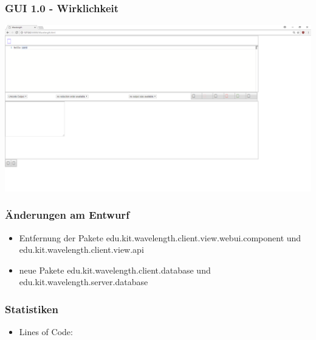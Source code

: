 \documentclass[10pt]{beamer}
\begin{document}
\begin{frame}
\frametitle{GUI 1.0 - Wirklichkeit}
\hspace*{-1cm}
\includegraphics[scale=0.19]{img/GUI1_Wirklichkeit.png}
\end{frame}


\begin{frame}
\frametitle{Änderungen am Entwurf}
\begin{itemize}
\item Entfernung der Pakete \alert{edu.kit.wavelength.client.view.webui.component} und \alert{edu.kit.wavelength.client.view.api}
\item neue Pakete \alert{edu.kit.wavelength.client.database} und \alert{edu.kit.wavelength.server.database}
\end{itemize}
\end{frame}

\begin{frame}
\frametitle{Statistiken}
\begin{itemize}
\item Lines of Code: 
\end{itemize}
\end{frame}
\end{document}

